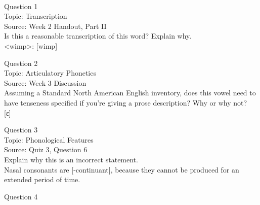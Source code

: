 \documentclass[12pt]{article}
\begin{document}
\begin{center}
\textbf{{\color{red}{\HUGE END OF EXAM}}}\\

\end{center}
\newpage

\begin{center}
\textbf{{\color{blue}{\HUGE START OF EXAM\\}}}

\textbf{{\color{blue}{\HUGE Student ID: 74134\\}}}

\textbf{{\color{blue}{\HUGE \\}}}

\end{center}
\newpage

{\large Question 1}\\

Topic: Transcription\\
Source: Week 2 Handout, Part II\\

Is this a reasonable transcription of this word? Explain why.\\

<wimp>: {[wimp]}


\newpage

{\large Question 2}\\

Topic: Articulatory Phonetics\\
Source: Week 3 Discussion\\

Assuming a Standard North American English inventory, does this vowel need to have tenseness specified if you're giving a prose description? Why or why not?\\

{[ɛ]}


\newpage

{\large Question 3}\\

Topic: Phonological Features\\
Source: Quiz 3, Question 6\\

Explain why this is an incorrect statement.\\

Nasal consonants are {[-continuant]}, because they cannot be produced for an extended period of time.


\newpage

{\large Question 4}\\
\end{document}
